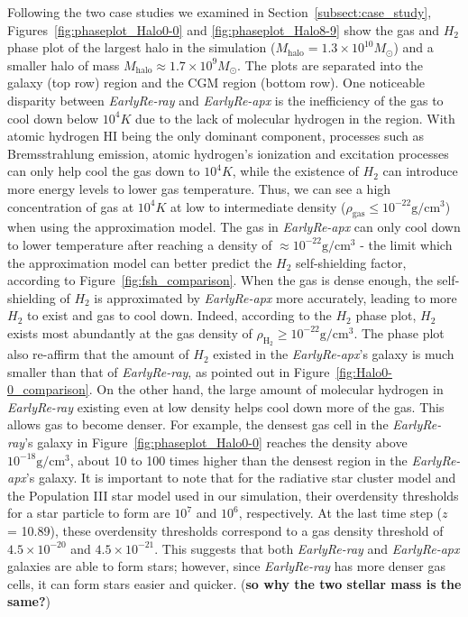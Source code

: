 \documentclass[linenumbers, twocolumn]{aastex631}
\begin{document}
Following the two case studies we examined in Section~\ref{subsect:case_study}, Figures~\ref{fig:phaseplot_Halo0-0} and \ref{fig:phaseplot_Halo8-9} show the gas and $H_{2}$ phase plot of the largest halo in the simulation ($M_{\mathrm{halo}} = 1.3\times10^{10} M_\odot$) and a smaller halo of mass $M_{\mathrm{halo}} \approx 1.7\times 10^{9} M_\odot$. The plots are separated into the galaxy (top row) region and the CGM region (bottom row). One noticeable disparity between \textit{EarlyRe-ray} and \textit{EarlyRe-apx} is the inefficiency of the gas to cool down below $10^{4} K$ due to the lack of molecular hydrogen in the region. With atomic hydrogen HI being the only dominant component, processes such as Bremsstrahlung emission, atomic hydrogen’s ionization and excitation processes can only help cool the gas down to $10^{4} K$, while the existence of $H_{2}$ can introduce more energy levels to lower gas temperature. Thus, we can see a high concentration of gas at $10^{4} K$ at low to intermediate density ($\rho_{\mathrm{gas}} \leq 10^{-22} \mathrm{g}/\mathrm{cm}^{3}$) when using the approximation model. The gas in \textit{EarlyRe-apx} can only cool down to lower temperature after reaching a density of $\approx 10^{-22} \mathrm{g}/\mathrm{cm}^{3}$ - the limit which the approximation model can better predict the $H_{2}$ self-shielding factor, according to Figure~\ref{fig:fsh_comparison}. When the gas is dense enough, the self-shielding of $H_{2}$ is approximated by \textit{EarlyRe-apx} more accurately, leading to more $H_{2}$ to exist and gas to cool down. Indeed, according to the $H_{2}$ phase plot, $H_{2}$ exists most abundantly at the gas density of $\rho_{\mathrm{H}_{2}} \geq 10^{-22} \mathrm{g}/\mathrm{cm}^{3}$. The phase plot also re-affirm that the amount of $H_{2}$ existed in the \textit{EarlyRe-apx}'s galaxy is much smaller than that of \textit{EarlyRe-ray}, as pointed out in Figure~\ref{fig:Halo0-0_comparison}. On the other hand, the large amount of molecular hydrogen in \textit{EarlyRe-ray} existing even at low density helps cool down more of the gas. This allows gas to become denser. For example, the densest gas cell in the \textit{EarlyRe-ray}'s galaxy in Figure~\ref{fig:phaseplot_Halo0-0} reaches the density above $10^{-18} \mathrm{g}/\mathrm{cm}^{3}$, about 10 to 100 times higher than the densest region in the \textit{EarlyRe-apx}'s galaxy. It is important to note that for the radiative star cluster model and the Population III star model used in our simulation, their overdensity thresholds for a star particle to form are $10^{7}$ and $10^{6}$, respectively. At the last time step ($z$ = 10.89), these overdensity thresholds correspond to a gas density threshold of $4.5\times 10^{-20}$ and $4.5\times 10^{-21}$. This suggests that both \textit{EarlyRe-ray} and \textit{EarlyRe-apx} galaxies are able to form stars; however, since \textit{EarlyRe-ray} has more denser gas cells, it can form stars easier and quicker. (\textbf{so why the two stellar mass is the same?})
\end{document}
